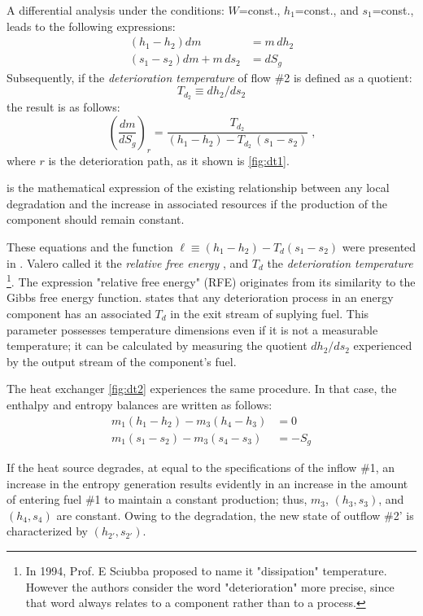 \documentclass[energies,article,submit,moreauthors,pdftex]{Definitions/mdpi}
\begin{document}
A differential analysis under the conditions: $W$=const., $h_1$=const., and $s_1$=const., leads to the following expressions:
\begin{align}
\left(h_1-h_2\right) dm &= m \, dh_2\\
\left(s_1-s_2\right) dm + m \, ds_2 &= dS_g
\end{align}
Subsequently, if the \emph{deterioration temperature} of flow \#2 is defined as a quotient:
\[
T_{d_2}\equiv dh_2/ds_2
\]
the result is as follows:
\begin{equation}
\left(\frac{dm}{dS_g}\right)_r =\frac{T_{d_2}}{\left(h_1-h_2\right)-T_{d_2}\,\left(s_1-s_2\right)}\;\text{,}
\label{eq:dt2}
\end{equation}
where $r$ is the deterioration path, as it shown is \cref{fig:dt1}.

 is the mathematical expression of the existing relationship between any local degradation and the increase in associated resources if the production of the component should remain constant.

These equations and the function $\ell\equiv (h_1-h_2) - T_d (s_1 - s_2)$ were presented in \cite{Valero1992b}. Valero called it the \emph{relative free energy} \cite{Royo1994,Royo1995}, and $T_d$ the \emph{deterioration temperature} \footnote{In 1994, Prof. E Sciubba proposed to name it "dissipation" temperature. However the authors consider the word "deterioration" more precise, since that word always relates to a component rather than to a process.}. The expression "relative free energy" (RFE) originates from its similarity to the Gibbs free energy function.  states that any deterioration process in an energy component has an associated $T_d$ in the exit stream  of suplying fuel. This parameter possesses temperature dimensions even if it is not a measurable temperature; it can be calculated by measuring the quotient $dh_2/ds_2$ experienced by the output stream of the component's fuel.

The heat exchanger \cref{fig:dt2} experiences the same procedure. In that case, the enthalpy and entropy balances are written as follows:
\begin{align}
m_1 \left(h_1 - h_2 \right) - m_3 \left(h_4 -h_3\right) &= 0 \\
m_1 \left(s_1 - s_2 \right) - m_3 \left(s_4 - s_3 \right) &= -S_g
\end{align}

If the heat source degrades, at equal to the specifications of the inflow \#1, an increase in the entropy generation results evidently in an increase in the amount of entering fuel \#1 to maintain a constant production; thus, $m_3$, $(h_3, s_3)$, and $(h_4, s_4)$ are constant. Owing to the degradation, the new state of outflow \#2' is characterized by $(h_{2'}, s_{2'})$.
\end{document}
